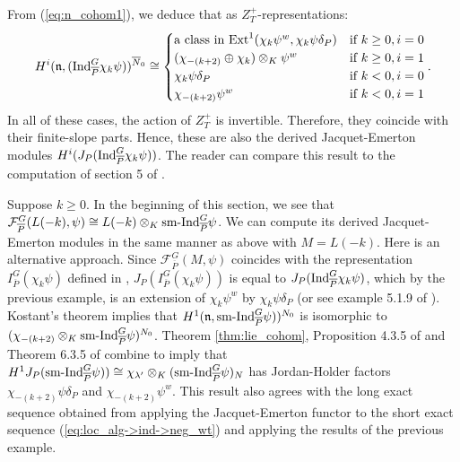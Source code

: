 \documentclass[10pt]{amsart}
\begin{document}
\begin{example}
From (\ref{eq:n_cohom1}), we deduce that as $Z_{T}^{+}$-representations: \begin{equation}\label{eq:DJp_Indchi}
    H^{i}(\mathfrak{n},(\textnormal{Ind}_{\overline{P}}^{G}\chi_{k}\psi))^{\overline{N}_{0}} \cong \begin{cases}
    \textnormal{a class in } \textnormal{Ext}^{1}(\chi_{k}\psi^{w},\chi_{k}\psi\delta_{P}) & \text{if } k \geq 0, i=0 \\
    (\chi_{-(k+2)}\oplus \chi_{k})\otimes_{K}\psi^{w} & \text{if } k \geq 0, i=1  \\
    \chi_{k}\psi\delta_{P} & \text{if } k < 0, i=0 \\
    \chi_{-(k+2)}\psi^{w} & \text{if } k < 0, i=1 
    \end{cases}.  
\end{equation} In all of these cases, the action of $Z_{T}^{+}$ is invertible. Therefore, they coincide with their finite-slope parts. Hence, these are also the derived Jacquet-Emerton modules $H^{i}(J_{P}(\textnormal{Ind}_{\overline{P}}^{G}\chi_{k}\psi))$. The reader can compare this result to the computation of section 5 of \cite{Jacquet2}.
\end{example} 

\begin{example}\label{ex:L(k)} Suppose $k\geq 0$. In the beginning of this section, we see that $\mathcal{F}_{\overline{P}}^{G}(L(-k),\psi)\cong L(-k)\otimes_{K}\textnormal{sm-Ind}_{\overline{P}}^{G}\psi$. We can compute its derived Jacquet-Emerton modules in the same manner as above with $M=L(-k)$. Here is an alternative approach. Since $\mathcal{F}_{\overline{P}}^{G}(M,\psi)$ coincides with the representation $I_{\overline{P}}^{G}(\chi_{k}\psi)$ defined in \cite{Jacquet2}, $J_{P}(I_{\overline{P}}^{G}(\chi_{k}\psi))$ is equal to $J_{P}(\textnormal{Ind}_{\overline{P}}^{G}\chi_{k}\psi)$, which by the previous example, is an extension of $\chi_{k}\psi^{w}$ by $\chi_{k}\psi\delta_{P}$ (or see example 5.1.9 of \cite{Jacquet2}). Kostant's theorem \cite[VI Thm 6.12]{Knapp} implies that $H^{1}(\mathfrak{n},\textnormal{sm-}\textnormal{Ind}_{\overline{P}}^{G}\psi))^{N_{0}}$ is isomorphic to $(\chi_{-(k+2)} \otimes_{K} \textnormal{sm-} \textnormal{Ind}_{\overline{P}}^{G} \psi)^{N_{0}}$. Theorem \ref{thm:lie_cohom}, Proposition  4.3.5 of \cite{Jacquet2} and Theorem 6.3.5 of \cite{Casselman} combine to imply that $H^{1}J_{P}(\textnormal{sm-}\textnormal{Ind}_{\overline{P}}^{G}\psi))\cong \chi_{\lambda^{\prime}} \otimes_{K} (\textnormal{sm-} \textnormal{Ind}_{\overline{P}}^{G} \psi)_{N}$ has Jordan-Holder factors $\chi_{-(k+2)}\psi\delta_{P}$ and $\chi_{-(k+2)}\psi^{w}$. This result also agrees with the long exact sequence obtained from applying the Jacquet-Emerton functor to the short exact sequence (\ref{eq:loc_alg->ind->neg_wt}) and applying the results of the previous example.
\end{example}
\end{document}
